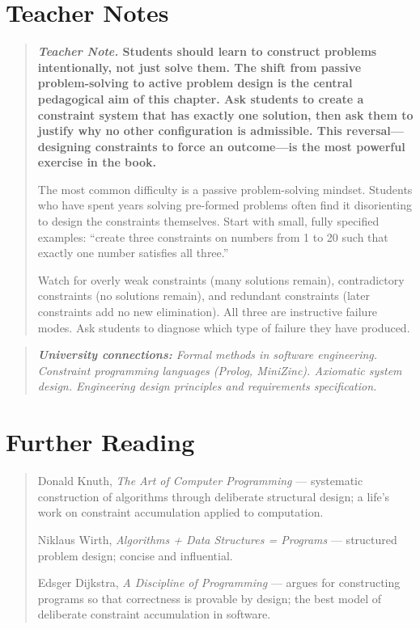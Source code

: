 \documentclass[11pt]{book}
\theoremstyle{plain}
\theoremstyle{definition}
\theoremstyle{remark}
\newenvironment{teachernote}
  {\begin{quote}\small\bfseries\textit{Teacher Note.}\normalfont\small\enspace\ignorespaces}
  {\end{quote}}
\newenvironment{universitybridge}
  {\begin{quote}\small\itshape\textbf{University connections:}\normalfont\small\itshape\enspace\ignorespaces}
  {\end{quote}}
\newenvironment{readinglist}
  {\begin{quote}\small}
  {\end{quote}}
\begin{document}
\section*{Teacher Notes}

\begin{teachernote}
Students should learn to construct problems intentionally, not just solve
them. The shift from passive problem-solving to active problem design is
the central pedagogical aim of this chapter. Ask students to create a
constraint system that has exactly one solution, then ask them to justify
why no other configuration is admissible. This reversal---designing
constraints to force an outcome---is the most powerful exercise in the
book.

The most common difficulty is a passive problem-solving mindset. Students
who have spent years solving pre-formed problems often find it
disorienting to design the constraints themselves. Start with small,
fully specified examples: ``create three constraints on numbers from 1 to
20 such that exactly one number satisfies all three.''

Watch for overly weak constraints (many solutions remain), contradictory
constraints (no solutions remain), and redundant constraints (later
constraints add no new elimination). All three are instructive failure
modes. Ask students to diagnose which type of failure they have produced.
\end{teachernote}

\begin{universitybridge}
Formal methods in software engineering. Constraint programming
languages (Prolog, MiniZinc). Axiomatic system design. Engineering
design principles and requirements specification.
\end{universitybridge}

\section*{Further Reading}

\begin{readinglist}
Donald Knuth, \textit{The Art of Computer Programming} --- systematic
construction of algorithms through deliberate structural design; a
life's work on constraint accumulation applied to computation.

Niklaus Wirth, \textit{Algorithms + Data Structures = Programs} ---
structured problem design; concise and influential.

Edsger Dijkstra, \textit{A Discipline of Programming} --- argues for
constructing programs so that correctness is provable by design; the
best model of deliberate constraint accumulation in software.
\end{readinglist}
\end{document}
